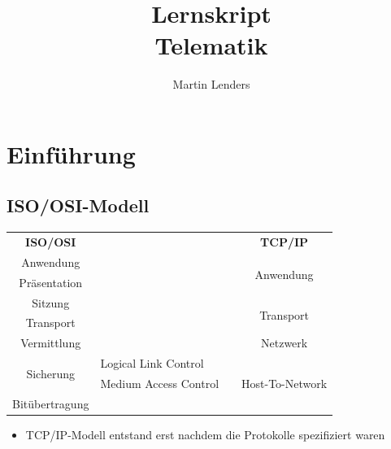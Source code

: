\documentclass[a4paper,10pt]{scrartcl}
\title{Lernskript\\\LARGE{}Telematik}
\author{Martin Lenders}
\begin{document}
\maketitle
\tableofcontents
\section{Einführung}
\subsection{ISO/OSI-Modell}
\begin{center}
    \begin{tabular}{|c|lc|c|}
    \multicolumn{1}{c}{\textbf{ISO/OSI}} & \multicolumn{2}{c}{\hspace{2cm}} & \multicolumn{1}{c}{\textbf{TCP/IP}}\\\cline{1-1}\cline{4-4}
    \multirow{2}{*}{Anwendung} && & \multirow{5}{*}{Anwendung} \\
     & && \\\cline{1-1}
    \multirow{2}{*}{Präsentation} && & \\
     & && \\\cline{1-1}
    \multirow{2}{*}{Sitzung} && & \\\cline{4-4}
     & && \multirow{3}{*}{Transport} \\\cline{1-1}
    \multirow{2}{*}{Transport} && & \\
     & && \\\cline{1-1}\cline{4-4}
    \multirow{2}{*}{Vermittlung} && & \multirow{2}{*}{Netzwerk} \\
     & && \\\cline{1-2}\cline{4-4}
    \multirow{2}{*}{Sicherung} & Logical Link Control & & \multirow{4}{*}{Host-To-Network} \\\cline{2-2}
     & Medium Access Control & & \\\cline{1-2}
    \multirow{2}{*}{Bitübertragung} &&&\\
    &&& \\\cline{1-1}\cline{4-4}
    \end{tabular}
\end{center}
\begin{itemize}
\item TCP/IP-Modell entstand erst nachdem die Protokolle spezifiziert waren
\end{itemize}
\end{document}
